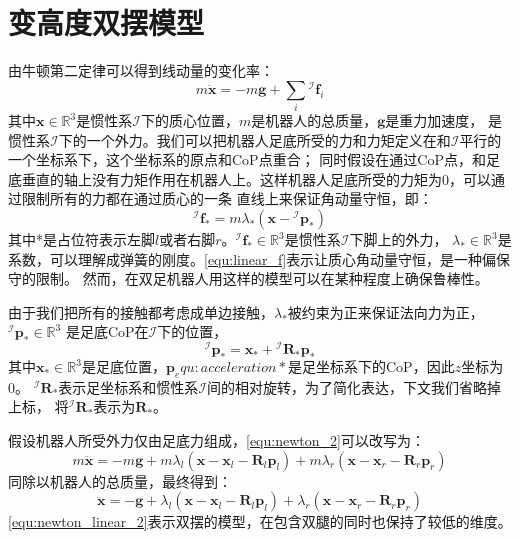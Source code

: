 \section{变高度双摆模型}
由牛顿第二定律可以得到线动量的变化率：
\begin{equation}
    \label{equ:newton_2}
    m \ddot{\boldsymbol{x}}=-m \boldsymbol{g}+\sum_i{ }^{\mathcal{I}} \boldsymbol{f}_i
\end{equation}
其中$\boldsymbol{x} \in \mathbb{R}^{3}$是惯性系$\mathcal{I}$下的质心位置，$m$是机器人的总质量，$\boldsymbol{g}$是重力加速度， 
是惯性系$\mathcal{I}$下的一个外力。我们可以把机器人足底所受的力和力矩定义在和$\mathcal{I}$平行的一个坐标系下，这个坐标系的原点和CoP点重合；
同时假设在通过CoP点，和足底垂直的轴上没有力矩作用在机器人上。这样机器人足底所受的力矩为0，可以通过限制所有的力都在通过质心的一条
直线上来保证角动量守恒，即：
\begin{equation}
    \label{equ:linear_f}
    { }^{\mathcal{I}} \boldsymbol{f}_*=m \lambda_*\left(\boldsymbol{x}-{ }^{\mathcal{I}} \boldsymbol{p}_*\right)
\end{equation}
其中*是占位符表示左脚$l$或者右脚$r$。${ }^{\mathcal{I}} \boldsymbol{f}_* \in \mathbb{R}^{3}$是惯性系$\mathcal{I}$下脚上的外力，
$\lambda_* \in \mathbb{R}^{3}$是系数，可以理解成弹簧的刚度。\autoref{equ:linear_f}表示让质心角动量守恒，是一种偏保守的限制。
然而，在双足机器人用这样的模型可以在某种程度上确保鲁棒性。

由于我们把所有的接触都考虑成单边接触，$\lambda_*$被约束为正来保证法向力为正，${ }^{\mathcal{I}} \boldsymbol{p}_* \in \mathbb{R}^{3}$
是足底CoP在$\mathcal{I}$下的位置，
\begin{equation}
    \label{equ:cop}
    { }^{\mathcal{I}} \boldsymbol{p}_*=\boldsymbol{x}_*+{ }^{\mathcal{I}} \boldsymbol{R}_* \boldsymbol{p}_*
\end{equation}
其中$\boldsymbol{x}_* \in \mathbb{R}^{3}$是足底位置，$\boldsymbol{p}_equ:acceleration*$是足坐标系下的CoP，因此$z$坐标为0。
${ }^{\mathcal{I}} \boldsymbol{R}_*$表示足坐标系和惯性系$\mathcal{I}$间的相对旋转，为了简化表达，下文我们省略掉上标，
将${ }^{\mathcal{I}} \boldsymbol{R}_*$表示为$\boldsymbol{R}_*$。

假设机器人所受外力仅由足底力组成，\autoref{equ:newton_2}可以改写为：
\begin{equation}
    \label{equ:newton_linear_1}
    m \ddot{\boldsymbol{x}}= -m \boldsymbol{g}+m \lambda_l\left(\boldsymbol{x}-\boldsymbol{x}_l-\boldsymbol{R}_l \boldsymbol{p}_l\right)
    +m \lambda_r\left(\boldsymbol{x}-\boldsymbol{x}_r-\boldsymbol{R}_r \boldsymbol{p}_r\right)
\end{equation}
同除以机器人的总质量，最终得到：
\begin{equation}
    \label{equ:newton_linear_2}
    \ddot{\boldsymbol{x}}= -\boldsymbol{g}+\lambda_l\left(\boldsymbol{x}-\boldsymbol{x}_l-\boldsymbol{R}_l \boldsymbol{p}_l\right) 
        +\lambda_r\left(\boldsymbol{x}-\boldsymbol{x}_r-\boldsymbol{R}_r \boldsymbol{p}_r\right)
\end{equation}
\autoref{equ:newton_linear_2}表示双摆的模型，在包含双腿的同时也保持了较低的维度。

